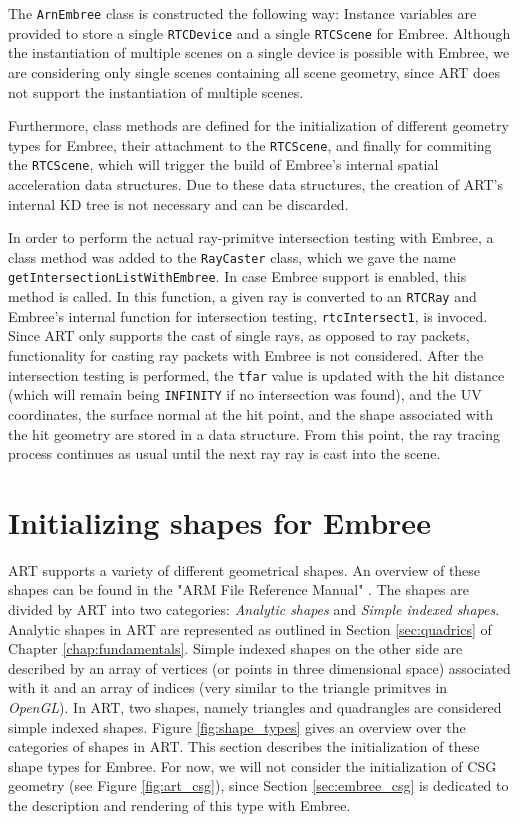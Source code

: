 The \texttt{ArnEmbree} class is constructed the following way: Instance variables are provided to store a single \texttt{RTCDevice} and a single \texttt{RTCScene} for Embree. Although the instantiation of multiple scenes on a single device is possible with Embree, we are considering only single scenes containing all scene geometry, since ART does not support the instantiation of multiple scenes. 

Furthermore, class methods are defined for the initialization of different geometry types for Embree, their attachment to the \texttt{RTCScene}, and finally for commiting the \texttt{RTCScene}, which will trigger the build of Embree's internal spatial acceleration data structures. Due to these data structures, the creation of ART's internal KD tree is not necessary and can be discarded.

In order to perform the actual ray-primitve intersection testing with Embree, a class method was added to the \texttt{RayCaster} class, which we gave the name \texttt{getIntersectionListWithEmbree}. In case Embree support is enabled, this method is called. In this function, a given ray is converted to an \texttt{RTCRay} and Embree's internal function for intersection testing, \texttt{rtcIntersect1}, is invoced. Since ART only supports the cast of single rays, as opposed to ray packets, functionality for casting ray packets with Embree is not considered. After the intersection testing is performed, the \texttt{tfar} value is updated with the hit distance (which will remain being \texttt{INFINITY} if no intersection was found), and the UV coordinates, the surface normal at the hit point, and the shape associated with the hit geometry are stored in a   data structure. From this point, the ray tracing process continues as usual until the next ray ray is cast into the scene.

\section{Initializing shapes for Embree}

ART supports a variety of different geometrical shapes. An overview of these shapes can be found in the "ARM File Reference Manual" \cite{artreferencemanual}. The shapes are divided by ART into two categories: \emph{Analytic shapes} and \emph{Simple indexed shapes}. Analytic shapes in ART are represented as outlined in Section \ref{sec:quadrics} of Chapter \ref{chap:fundamentals}. Simple indexed shapes on the other side are described by an array of vertices (or points in three dimensional space) associated with it and an array of indices (very similar to the triangle primitves in \emph{OpenGL}). In ART, two shapes, namely triangles and quadrangles are considered simple indexed shapes. Figure \ref{fig:shape_types} gives an overview over the categories of shapes in ART. This section describes the initialization of these shape types for Embree. For now, we will not consider the initialization of CSG geometry (see Figure \ref{fig:art_csg}), since Section \ref{sec:embree_csg} is dedicated to the description and rendering of this type with Embree.

